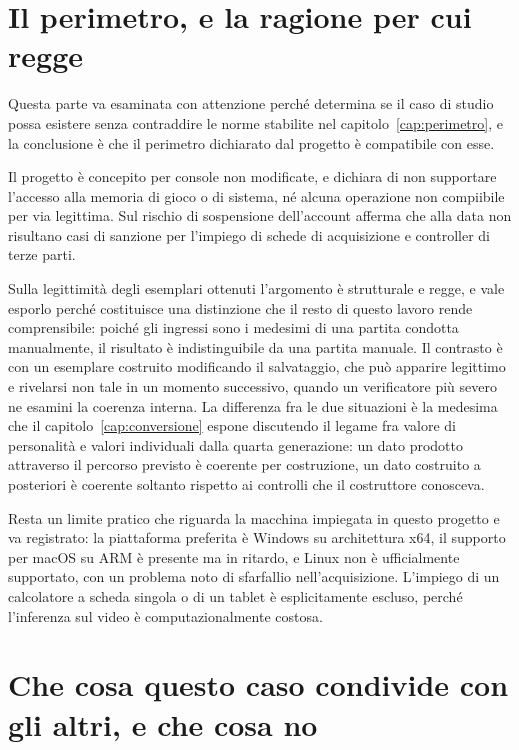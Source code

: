 \section{Il perimetro, e la ragione per cui regge}

Questa parte va esaminata con attenzione perché determina se il caso di studio possa esistere senza contraddire le norme stabilite nel capitolo~\ref{cap:perimetro}, e la conclusione è che il perimetro dichiarato dal progetto è compatibile con esse.

Il progetto è concepito per console non modificate, e dichiara di non supportare l'accesso alla memoria di gioco o di sistema, né alcuna operazione non compiibile per via legittima. Sul rischio di sospensione dell'account afferma che alla data non risultano casi di sanzione per l'impiego di schede di acquisizione e controller di terze parti.

Sulla legittimità degli esemplari ottenuti l'argomento è strutturale e regge, e vale esporlo perché costituisce una distinzione che il resto di questo lavoro rende comprensibile: poiché gli ingressi sono i medesimi di una partita condotta manualmente, il risultato è indistinguibile da una partita manuale. Il contrasto è con un esemplare costruito modificando il salvataggio, che può apparire legittimo e rivelarsi non tale in un momento successivo, quando un verificatore più severo ne esamini la coerenza interna. La differenza fra le due situazioni è la medesima che il capitolo~\ref{cap:conversione} espone discutendo il legame fra valore di personalità e valori individuali dalla quarta generazione: un dato prodotto attraverso il percorso previsto è coerente per costruzione, un dato costruito a posteriori è coerente soltanto rispetto ai controlli che il costruttore conosceva.

Resta un limite pratico che riguarda la macchina impiegata in questo progetto e va registrato: la piattaforma preferita è Windows su architettura x64, il supporto per macOS su ARM è presente ma in ritardo, e Linux non è ufficialmente supportato, con un problema noto di sfarfallio nell'acquisizione. L'impiego di un calcolatore a scheda singola o di un tablet è esplicitamente escluso, perché l'inferenza sul video è computazionalmente costosa.

\section{Che cosa questo caso condivide con gli altri, e che cosa no}


